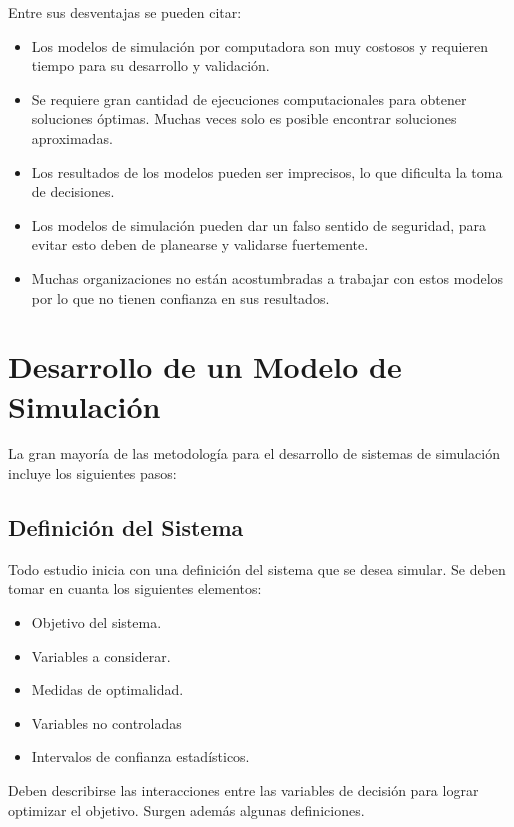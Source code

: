 Entre sus desventajas se pueden citar:
\begin{itemize}
\item Los modelos de simulación por computadora son muy costosos y requieren tiempo para su desarrollo y validación.

\item Se requiere gran cantidad de ejecuciones computacionales para obtener soluciones óptimas. Muchas veces solo es posible encontrar soluciones aproximadas.

\item Los resultados de los modelos pueden ser imprecisos, lo que dificulta la toma de decisiones.

\item Los modelos de simulación pueden dar un falso sentido de seguridad, para evitar esto deben de planearse y validarse fuertemente.

\item Muchas organizaciones no están acostumbradas a trabajar con estos modelos por lo que no tienen confianza en sus resultados.
\end{itemize}



\section{ Desarrollo de un Modelo de Simulación}

La gran mayoría de las metodología para el desarrollo de sistemas de simulación incluye los siguientes pasos:


\subsection{Definición del Sistema}
Todo estudio inicia con una definición del sistema que se desea simular. Se deben tomar en cuanta los siguientes elementos: 
\begin{itemize}
\item Objetivo del sistema.
\item Variables a considerar.
\item Medidas de optimalidad.
\item Variables no controladas
\item Intervalos de confianza estadísticos.
\end{itemize}

Deben describirse las interacciones entre las variables de decisión para lograr optimizar el objetivo. Surgen además algunas definiciones.

